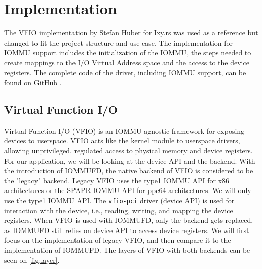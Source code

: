 \chapter{Implementation} \label{c:impl}

The VFIO implementation by Stefan Huber for Ixy.rs was used as a reference but changed to fit the project structure and use case. The implementation for IOMMU support includes the initialization of the IOMMU, the steps needed to create mappings to the I/O Virtual Address space and the access to the device registers. The complete code of the driver, including IOMMU support, can be found on GitHub \cite{vroomsource}.

\section{Virtual Function I/O}
Virtual Function I/O (VFIO) is an IOMMU agnostic framework for exposing devices to userspace. VFIO acts like the kernel module to userspace drivers, allowing unprivileged, regulated access to physical memory and device registers. For our application, we will be looking at the device API and the backend. With the introduction of IOMMUFD, the native backend of VFIO is considered to be the "legacy" backend. Legacy VFIO uses the type1 IOMMU API for x86 architectures or the SPAPR IOMMU API for ppc64 architectures. We will only use the type1 IOMMU API. The \texttt{vfio-pci} driver (device API) is used for interaction with the device, i.e., reading, writing, and mapping the device registers. When VFIO is used with IOMMUFD, only the backend gets replaced, as IOMMUFD still relies on device API to access device registers. We will first focus on the implementation of legacy VFIO, and then compare it to the implementation of IOMMUFD.
The layers of VFIO with both backends can be seen on \autoref{fig:layer}.

